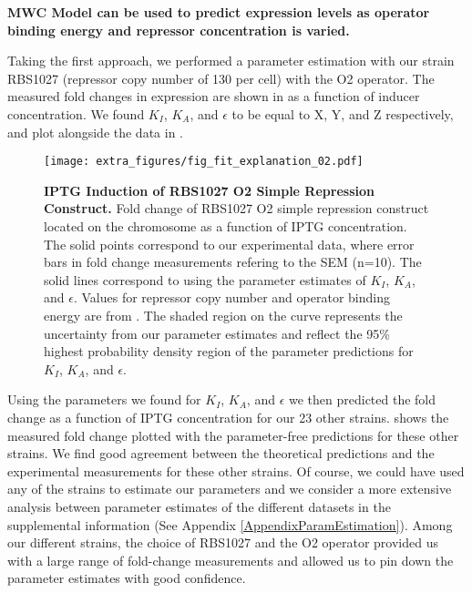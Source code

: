 \noindent \textbf{MWC Model can be used to predict expression levels as operator binding energy and repressor concentration is varied.} 

Taking the first approach, we performed a parameter estimation with our strain RBS1027 (repressor copy number of 130 per cell) with the O2 operator. The measured fold changes in expression are shown in  as a function of inducer concentration. We found $K_I$, $K_A$, and $\epsilon$ to be equal to X, Y, and Z respectively, and plot \eref[eq7] alongside the data in . 

\begin{figure}[h]
	\centering \texttt{[image: extra\_figures/fig\_fit\_explanation\_02.pdf]}
	\caption{{\bf IPTG Induction of RBS1027 O2 Simple Repression Construct.} Fold change of RBS1027 O2 simple repression construct located on the chromosome as a function of IPTG concentration. The solid points correspond to our experimental data, where error bars in fold change measurements refering to the SEM (n=10). The solid lines correspond to \eref[eq7] using the parameter estimates of $K_I$, $K_A$, and $\epsilon$. Values for repressor copy number and operator binding energy are from \cite{Garcia2011}.  The shaded region on the curve represents the uncertainty from our parameter estimates and reflect the 95\% highest probability density region of the parameter predictions for $K_I$, $K_A$, and $\epsilon$.}
	\label{fig_result1}
\end{figure}

Using the parameters we found for $K_I$, $K_A$, and $\epsilon$ we then predicted the fold change as a function of IPTG concentration for our 23 other strains.  shows the measured fold change plotted with the parameter-free predictions for these other strains. We find good agreement between the theoretical predictions and the experimental measurements for these other strains. Of course, we could have used any of the strains to estimate our parameters and we consider a more extensive analysis between parameter estimates of the different datasets in the supplemental information (See Appendix \ref{AppendixParamEstimation}). Among our different strains, the choice of RBS1027 and the O2 operator provided us with a large range of fold-change measurements and allowed us to pin down the parameter estimates with good confidence.  

